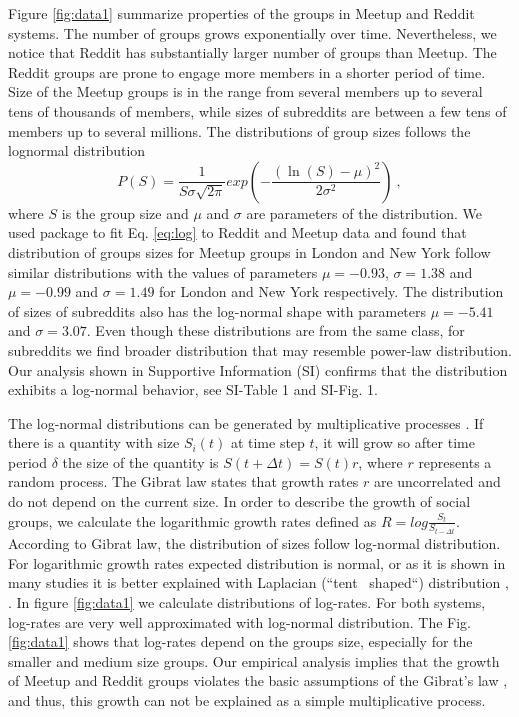 Figure \ref{fig:data1} summarize properties of the groups in Meetup and Reddit systems. The number of groups grows exponentially over time. Nevertheless, we notice that Reddit has substantially larger number of groups than Meetup. The Reddit groups are prone to engage more members in a shorter period of time. Size of the Meetup groups is in the range from several members up to several tens of thousands of members, while sizes of subreddits are between a few tens of members up to several millions.
The distributions of group sizes follows the lognormal distribution
\begin{equation}
P(S)=\frac{1}{S\sigma\sqrt{2\pi}}exp(-\frac{(\ln(S)-\mu)^{2}}{2\sigma^{2}})
\label{eq:log} \ ,
\end{equation}
where $S$ is the group size and $\mu$ and $\sigma$ are parameters of the distribution. We used package \cite{powerlaw} to fit Eq. \ref{eq:log} to Reddit and Meetup data and found that distribution of groups sizes for Meetup groups in London and New York follow similar distributions with the values of parameters $\mu= -0.93$, $\sigma = 1.38$ and $\mu=-0.99$ and $\sigma=1.49$ for London and New York respectively. The distribution of sizes of subreddits also has the log-normal shape with parameters $\mu= -5.41$ and $\sigma = 3.07$. Even though these distributions are from the same class, for subreddits we find broader distribution that may resemble power-law distribution. Our analysis shown in Supportive Information (SI) confirms that the distribution exhibits a log-normal behavior, see SI-Table 1 and SI-Fig. 1.  



The log-normal distributions can be generated by multiplicative processes \cite{mitzenmacher2004brief}. If there is a quantity with size $S_i(t)$ at time step $t$, it will grow so after time period $\delta$ the size of the quantity is $S(t+\Delta t) = S(t) r$, where $r$ represents a random process. The Gibrat law states that growth rates $r$ are uncorrelated and do not depend on the current size. In order to describe the growth of social groups, we calculate the logarithmic growth rates defined as $R = log\frac{S_t}{S_{t-\Delta t}}$. According to Gibrat law, the distribution of sizes follow log-normal distribution. For logarithmic growth rates expected distribution is normal, or as it is shown in many studies it is better explained with Laplacian (“tent  shaped“) distribution \cite{mondani2014fat}, \cite{fu2005growth}. In figure \ref{fig:data1} we calculate distributions of log-rates. For both systems, log-rates are very well approximated with log-normal distribution. The Fig. \ref{fig:data1} shows that log-rates depend on the groups size, especially for the smaller and medium size groups. Our empirical analysis implies that the growth of Meetup and Reddit groups violates the basic assumptions of the Gibrat's law \cite{frasco2014spatially, qian2014origin}, and thus, this growth can not be explained as a simple multiplicative process.\\

